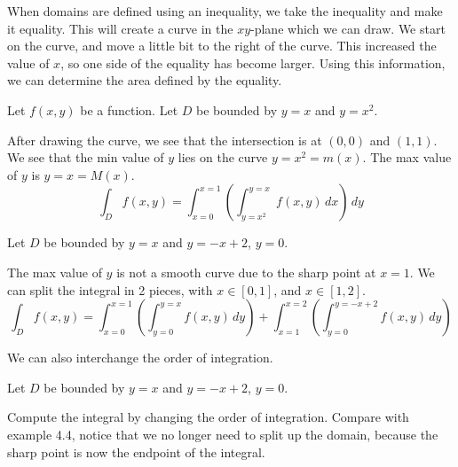 When domains are defined using an inequality, we take the inequality and make it equality. This will create a curve in the $xy$-plane which we can draw. We start on the curve, and move a little bit to the right of the curve. This increased the value of $x$, so one side of the equality has become larger. Using this information, we can determine the area defined by the equality.

\begin{example}
    Let $f(x, y)$ be a function. Let $D$ be bounded by $y = x$ and $y = x^2$.

    \begin{center}
    \end{center}

    After drawing the curve, we see that the intersection is at $(0, 0)$ and $(1, 1)$. We see that the min value of $y$ lies on the curve $y = x^2 = m(x)$. The max value of $y$ is $y = x = M(x)$.
    $$\int_D f(x, y) = \int_{x=0}^{x=1} \left( \int_{y=x^2}^{y=x} f(x, y) \,dx \right) \,dy$$
\end{example}

\begin{example}
    Let $D$ be bounded by $y = x$ and $y = -x + 2$, $y = 0$.

    The max value of $y$ is not a smooth curve due to the sharp point at $x = 1$. We can split the integral in 2 pieces, with $x \in [0, 1]$, and $x \in [1, 2]$.
    $$\int_D f(x, y) = \int_{x=0}^{x=1} \left( \int_{y=0}^{y=x} f(x, y) \,dy \right) + \int_{x=1}^{x=2} \left( \int_{y=0}^{y=-x+2} f(x, y) \,dy \right)$$

    We can also interchange the order of integration.
\end{example}

\begin{exercise}
    Let $D$ be bounded by $y = x$ and $y = -x + 2$, $y = 0$.

    Compute the integral by changing the order of integration. Compare with example 4.4, notice that we no longer need to split up the domain, because the sharp point is now the endpoint of the integral.
\end{exercise}

